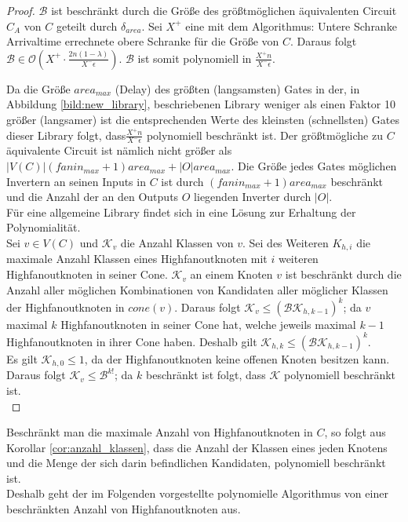 \documentclass[11pt, a4paper, german]{article}
\begin{document}
\begin{proof}
$\mathcal{B}$ ist beschränkt durch die Größe des größtmöglichen äquivalenten Circuit $C_A$ von $C$ geteilt durch $\delta_{area}$. Sei $X^+$ eine mit dem Algorithmus: Untere Schranke Arrivaltime errechnete obere Schranke für die Größe von $C$. Daraus folgt $\mathcal{B} \in \mathcal{O}(X^+ \cdot \frac{2n(1-\lambda)}{X^- \epsilon})$. $\mathcal{B} $ ist somit polynomiell in $\frac{X^+ n}{X^- \epsilon}$. 



Da die Größe $area_{max}$ (Delay) des größten (langsamsten) Gates in der, in Abbildung \ref{bild:new_library}, beschriebenen Library weniger als einen Faktor 10 größer (langsamer) ist die entsprechenden Werte des kleinsten (schnellsten) Gates dieser Library folgt, dass$\frac{X^+ n}{X^- \epsilon}$ polynomiell beschränkt ist. Der größtmögliche zu $C$ äquivalente Circuit ist nämlich nicht größer als $|V(C)|(fanin_{max}+1)area_{max} + |O|area_{max}$. Die Größe jedes Gates möglichen Invertern an seinen Inputs in $C$ ist durch $(fanin_{max}+1)area_{max}$ beschränkt und die Anzahl der an den Outputs $O$ liegenden Inverter durch $|O|$.\\
Für eine allgemeine Library findet sich in \cite{Elbert} eine Lösung zur Erhaltung der Polynomialität.\\
Sei $v \in V(C)$ und $\mathcal{K}_v$ die Anzahl Klassen von $v$. Sei des Weiteren $K_{h,i}$ die maximale Anzahl Klassen eines Highfanoutknoten mit $i$ weiteren Highfanoutknoten in seiner Cone. 
$\mathcal{K}_v$ an einem Knoten $v$ ist beschränkt durch die Anzahl aller möglichen Kombinationen von Kandidaten aller möglicher Klassen der Highfanoutknoten in $cone(v)$. Daraus folgt $\mathcal{K}_v \leq (\mathcal{BK}_{h,k-1})^k$; da $v$ maximal $k$ Highfanoutknoten in seiner Cone hat, welche jeweils maximal $k-1$ Highfanoutknoten in ihrer Cone haben. Deshalb gilt $\mathcal{K}_{h,k} \leq (\mathcal{BK}_{h,k-1})^k$.\\
Es gilt $\mathcal{K}_{h,0} \leq 1$, da der Highfanoutknoten keine offenen Knoten besitzen kann. \\
Daraus folgt $\mathcal{K}_v \leq \mathcal{B}^{k!}$; da $k$ beschränkt ist folgt, dass $\mathcal{K}$ polynomiell beschränkt ist.\\
\end{proof}

Beschränkt man die maximale Anzahl von Highfanoutknoten in $C$, so folgt aus Korollar \ref{cor:anzahl_klassen}, dass die Anzahl der Klassen eines jeden Knotens und die Menge der sich darin befindlichen Kandidaten, polynomiell beschränkt ist. \\
Deshalb geht der im Folgenden vorgestellte polynomielle Algorithmus von einer beschränkten Anzahl von Highfanoutknoten aus.\\ 
\end{document}
